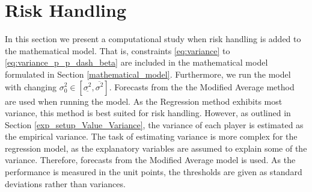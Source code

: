 \section{Risk Handling}

In this section we present a computational study when risk handling is added to the mathematical model. That is, constraints \ref{eq:variance} to \ref{eq:variance_p_p_dash_beta} are included in the mathematical model formulated in Section \ref{mathematical_model}. Furthermore, we run the model with changing $\sigma_{0}^2 \in [\underline{\sigma^2}, \overline{\sigma^2}]$. Forecasts from the the Modified Average method are used when running the model. As the Regression method exhibits most variance, this method is best suited for risk handling. However, as outlined in Section \ref{exp_setup_Value_Variance}, the variance of each player is estimated as the empirical variance. The task of estimating variance is more complex for the regression model, as the explanatory variables are assumed to explain some of the variance. Therefore, forecasts from the Modified Average model is used. As the performance is measured in the unit points, the thresholds are given as standard deviations rather than variances. 

